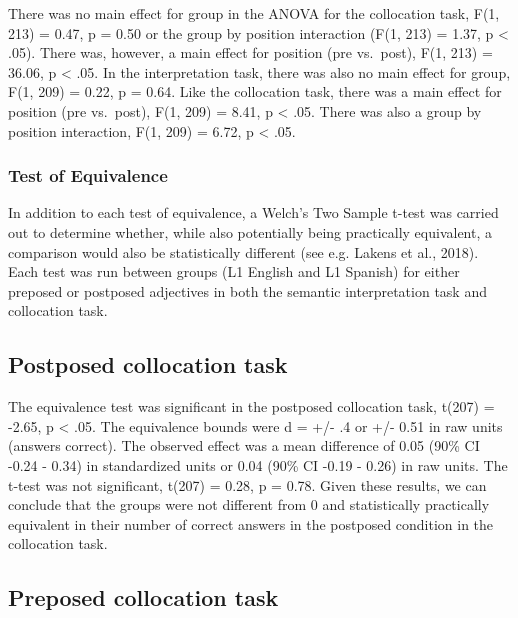 \documentclass[
  man,floatsintext]{apa6}
\begin{document}
There was no main effect for group in the ANOVA for the collocation task, F(1, 213) = 0.47, p = 0.50 or the group by position interaction (F(1, 213) = 1.37, p \textless{} .05).
There was, however, a main effect for position (pre vs.~post), F(1, 213) = 36.06, p \textless{} .05.
In the interpretation task, there was also no main effect for group, F(1, 209) = 0.22, p = 0.64.
Like the collocation task, there was a main effect for position (pre vs.~post), F(1, 209) = 8.41, p \textless{} .05.
There was also a group by position interaction, F(1, 209) = 6.72, p \textless{} .05.

\hypertarget{test-of-equivalence}{%
\subsubsection{Test of Equivalence}\label{test-of-equivalence}}

In addition to each test of equivalence, a Welch's Two Sample t-test was carried out to determine whether, while also potentially being practically equivalent, a comparison would also be statistically different (see e.g. Lakens et al., 2018).
Each test was run between groups (L1 English and L1 Spanish) for either preposed or postposed adjectives in both the semantic interpretation task and collocation task.

\hypertarget{postposed-collocation-task}{%
\subsection{Postposed collocation task}\label{postposed-collocation-task}}

The equivalence test was significant in the postposed collocation task, t(207) = -2.65, p \textless{} .05.
The equivalence bounds were d = +/- .4 or +/- 0.51 in raw units (answers correct).
The observed effect was a mean difference of 0.05 (90\% CI -0.24 - 0.34) in standardized units or 0.04 (90\% CI -0.19 - 0.26) in raw units.
The t-test was not significant, t(207) = 0.28, p = 0.78.
Given these results, we can conclude that the groups were not different from 0 and statistically practically equivalent in their number of correct answers in the postposed condition in the collocation task.

\hypertarget{preposed-collocation-task}{%
\subsection{Preposed collocation task}\label{preposed-collocation-task}}
\end{document}
